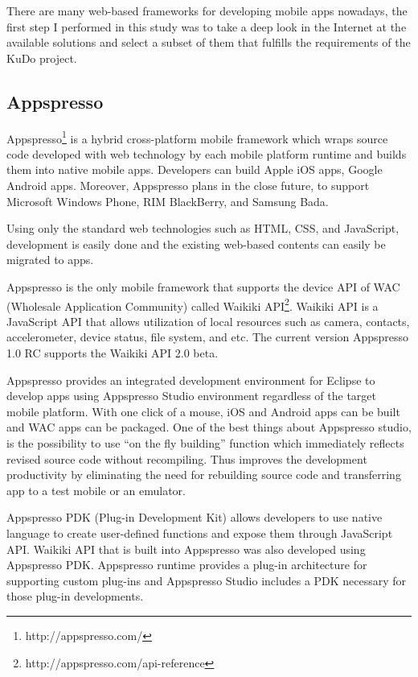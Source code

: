 \documentclass[a4paper,12pt]{book}
\begin{document}
There are many web-based frameworks for developing mobile apps nowadays, the first step I performed in this study was to take a deep look in the Internet at the available solutions and select a subset of them that fulfills the requirements of the KuDo project. 
 
\subsection{Appspresso}
\label{Appspresso} 
 
Appspresso\footnote{http://appspresso.com/}  is a hybrid cross-platform mobile framework which wraps source code developed with web technology by each mobile platform runtime and builds them into native mobile apps. Developers can build Apple iOS apps, Google Android apps. Moreover, Appspresso plans in the close future, to support Microsoft Windows Phone, RIM BlackBerry, and Samsung Bada. 

Using only the standard web technologies such as HTML, CSS, and JavaScript, development is easily done  and the existing web-based contents can easily be migrated to apps.

Appspresso is the only mobile framework that supports the device API of WAC (Wholesale Application Community) called Waikiki API\footnote{http://appspresso.com/api-reference}. Waikiki API is a JavaScript API that allows utilization of local resources such as camera, contacts, accelerometer, device status, file system, and etc. The current version Appspresso 1.0 RC supports the Waikiki API 2.0 beta.

Appspresso provides an integrated development environment for Eclipse to develop apps using Appspresso Studio environment regardless of the target mobile platform. With one click of a mouse, iOS and Android apps can be built and WAC apps can be packaged. One of the best things about Appspresso studio, is the possibility to use “on the fly building” function which immediately reflects revised source code without recompiling. Thus improves the development productivity by eliminating the need for rebuilding source code and transferring app to a test mobile or an emulator. 

Appspresso PDK (Plug-in Development Kit) allows developers to use native language to create user-defined functions and expose them through JavaScript API. Waikiki API that is built into Appspresso was also developed using Appspresso PDK. Appspresso runtime provides a plug-in architecture for supporting custom plug-ins and Appspresso Studio includes a PDK necessary for those plug-in developments.
\end{document}
